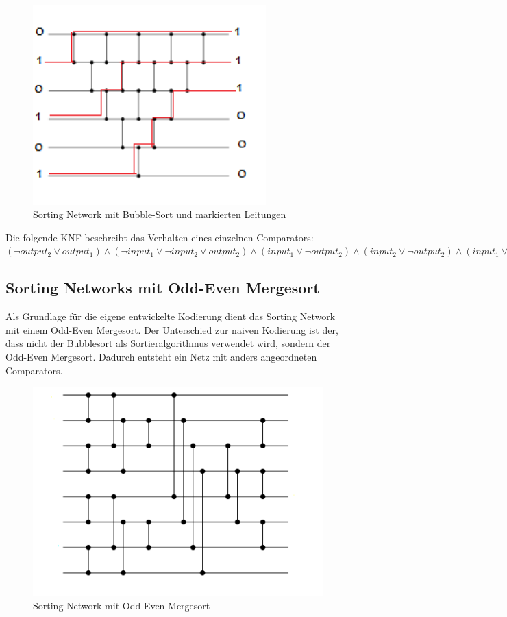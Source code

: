 \documentclass[a4,abstract=on]{scrartcl}
\begin{document}
\begin{figure}[H]
\centering
\includegraphics[width=9cm]{sorting_network_bubble_rot.png}
\caption{Sorting Network mit Bubble-Sort und markierten Leitungen}
\label{fig:sorting_network_naiv_bsp1}
\end{figure}

Die folgende KNF beschreibt das Verhalten eines einzelnen Comparators:\\
$(\neg output_2 \vee output_1) \wedge (\neg input_1 \vee \neg input_2 \vee output_2) \wedge (input_1 \vee \neg output_2) \wedge (input_2 \vee \neg output_2) \wedge (input_1 \vee input_2 \vee \neg output_1) \wedge (\neg input_1 \vee output_1) \wedge (\neg input_2 \vee output_1)$

	\subsection{Sorting Networks mit Odd-Even Mergesort}
Als Grundlage für die eigene entwickelte Kodierung dient das Sorting Network mit einem Odd-Even Mergesort. Der Unterschied zur naiven Kodierung ist der, dass nicht der Bubblesort als Sortieralgorithmus verwendet wird, sondern der Odd-Even Mergesort. Dadurch entsteht ein Netz mit anders angeordneten Comparators.

\begin{figure}[H]
\centering
\includegraphics[width=\textwidth]{odd-even-mergesort.png}
\caption{Sorting Network mit Odd-Even-Mergesort}
\label{fig:odd-even-mergesort}
\end{figure}
\end{document}
